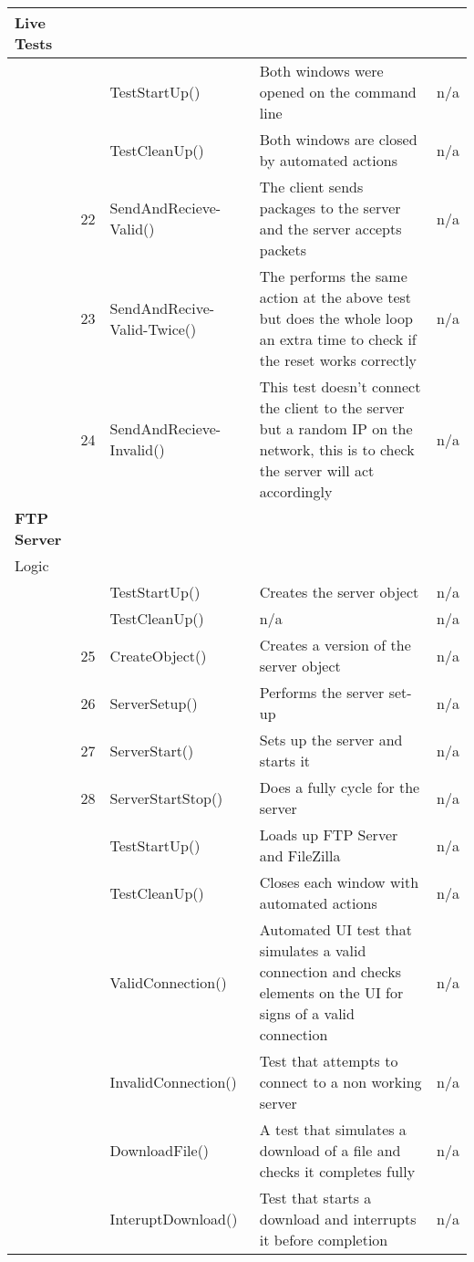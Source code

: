\begin{appendices}
\begin{longtable}{| p{2cm} | p{0.5cm} | p{4cm} | p{5cm} | p{3cm} |}
		Live Tests &&&& \\ \hline
		&& TestStartUp() & Both windows were opened on the command line & n/a \\ \hline
		&& TestCleanUp() & Both windows are closed by automated actions & n/a \\ \hline
		&22& SendAndRecieve-Valid() & The client sends packages to the server and the server accepts packets & n/a \\ \hline
		&23& SendAndRecive-Valid-Twice() & The performs the same action at the above test but does the whole loop an extra time to check if the reset works correctly & n/a \\ \hline
		&24& SendAndRecieve-Invalid() & This test doesn't connect the client to the server but a random IP on the network, this is to check the server will act accordingly & n/a \\ \hline

		\bf{FTP Server} &&&& \\ \hline
		
		Logic &&&& \\ \hline
		&& TestStartUp() & Creates the server object & n/a \\ \hline
		&& TestCleanUp() & n/a & n/a \\ \hline
		&25& CreateObject() & Creates a version of the server object & n/a \\ \hline
		&26& ServerSetup() & Performs the server set-up & n/a \\ \hline
		&27& ServerStart() & Sets up the server and starts it & n/a \\ \hline
		&28& ServerStartStop() & Does a fully cycle for the server & n/a \\ \hline
		
		&& TestStartUp() & Loads up FTP Server and FileZilla & n/a \\ \hline
		&& TestCleanUp() & Closes each window with automated actions & n/a \\ \hline
		&& ValidConnection() & Automated UI test that simulates a valid connection and checks elements on the UI for signs of a valid connection & n/a \\ \hline
		&& InvalidConnection() & Test that attempts to connect to a non working server & n/a \\ \hline
		&& DownloadFile() & A test that simulates a download of a file and checks it completes fully & n/a \\ \hline
		&& InteruptDownload() & Test that starts a download and interrupts it before completion & n/a \\ \hline
	\hline
\end{longtable}


\end{appendices}
